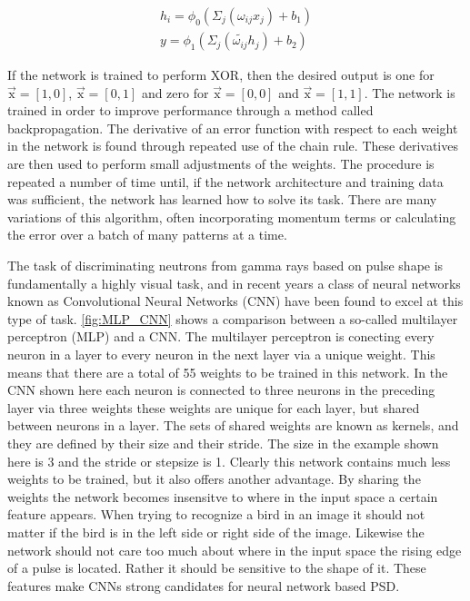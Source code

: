 \documentclass[main.tex]{subfiles}
\begin{document}
\begin{appendices}
\begin{equation}
	\begin{split}
	h_i = \phi_0\left(\Sigma_j \left( \omega_{ij}x_j \right) + b_1\right)\\
	y = \phi_1\left(\Sigma_j \left( \tilde{\omega_{ij}}h_j \right) + b_2\right)
	\end{split}
\end{equation}

If the network is trained to perform XOR, then the desired output is one for $\vec{\textrm{x}} = [1,0]$, $\vec{\textrm{x}} = [0,1]$ and zero for $\vec{\textrm{x}} = [0,0]$ and  $\vec{\textrm{x}} = [1,1]$. The network is trained in order to improve performance through a method called backpropagation. The derivative of an error function with respect to each weight in the network is found through repeated use of the chain rule. These derivatives are then used to perform small adjustments of the weights. The procedure is repeated a number of time until, if the network architecture and training data was sufficient, the network has learned how to solve its task. There are many variations of this algorithm, often incorporating momentum terms or calculating the error over a batch of many patterns at a time.

The task of discriminating neutrons from gamma rays based on pulse shape is fundamentally a highly visual task, and in recent years a class of neural networks known as Convolutional Neural Networks (CNN) have been found to excel at this type of task. \ref{fig:MLP_CNN} shows a comparison between a so-called multilayer perceptron (MLP) and a CNN. The multilayer perceptron is conecting every neuron in a layer to every neuron in the next layer via a unique weight. This means that there are a total of 55 weights to be trained in this network. In the CNN shown here each neuron is connected to three neurons in the preceding layer via three weights these weights are unique for each layer, but shared between neurons in a layer. The sets of shared weights are known as kernels, and they are defined by their size and their stride. The size in the example shown here is 3 and the stride or stepsize is 1. Clearly this network contains much less weights to be trained, but it also offers another advantage. By sharing the weights the network becomes insensitve to where in the input space a certain feature appears. When trying to recognize a bird in an image it should not matter if the bird is in the left side or right side of the image. Likewise the network should not care too much about where in the input space the rising edge of a pulse is located. Rather it should be sensitive to the shape of it. These features make CNNs strong candidates for neural network based PSD.


\end{appendices}
\end{document}
